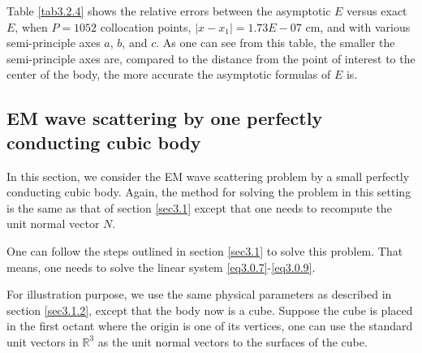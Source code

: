 \documentclass[12pt]{article}
\numberwithin{equation}{section}
\newcommand{\RRR}{\mathbb{R}^3}
\begin{document}
Table \ref{tab3.2.4} shows the relative errors between the asymptotic $E$ versus exact $E$, when $P=1052$ collocation points, $|x-x_1|=1.73E-07$ cm, and with various semi-principle axes $a$, $b$, and $c$. As one can see from this table, the smaller the semi-principle axes are, compared to the distance from the point of interest to the center of the body, the more accurate the asymptotic formulas of $E$ is.

\subsection{EM wave scattering by one perfectly conducting cubic body}\label{sec3.3}
In this section, we consider the EM wave scattering problem by a small perfectly conducting cubic body. Again, the method for solving the problem in this setting is the same as that of section \ref{sec3.1} except that one needs to recompute the unit normal vector $N$.

One can follow the steps outlined in section \ref{sec3.1} to solve this problem. That means, one needs to solve the linear system \eqref{eq3.0.7}-\eqref{eq3.0.9}.

For illustration purpose, we use the same physical parameters as described in section \ref{sec3.1.2}, except that the body now is a cube. Suppose the cube is placed in the first octant where the origin is one of its vertices, one can use the standard unit vectors in $\RRR$ as the unit normal vectors to the surfaces of the cube.
\end{document}
